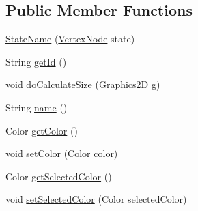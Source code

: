 \subsection*{Public Member Functions}
\begin{DoxyCompactItemize}
\item 
\hyperlink{classorg_1_1tzi_1_1use_1_1gui_1_1views_1_1diagrams_1_1statemachine_1_1_state_name_a354e23ea530608c8c6857a61eee9492a}{State\-Name} (\hyperlink{classorg_1_1tzi_1_1use_1_1gui_1_1views_1_1diagrams_1_1statemachine_1_1_vertex_node}{Vertex\-Node} state)
\item 
String \hyperlink{classorg_1_1tzi_1_1use_1_1gui_1_1views_1_1diagrams_1_1statemachine_1_1_state_name_ac1d30ebce2ad16f1b1d82355ebb743f3}{get\-Id} ()
\item 
void \hyperlink{classorg_1_1tzi_1_1use_1_1gui_1_1views_1_1diagrams_1_1statemachine_1_1_state_name_a2314dea1f28ae5cb8d570666411fa388}{do\-Calculate\-Size} (Graphics2\-D g)
\item 
String \hyperlink{classorg_1_1tzi_1_1use_1_1gui_1_1views_1_1diagrams_1_1statemachine_1_1_state_name_a73525b08944bd66e9c221cf79d8ffd98}{name} ()
\item 
Color \hyperlink{classorg_1_1tzi_1_1use_1_1gui_1_1views_1_1diagrams_1_1statemachine_1_1_state_name_a9572c6df9322ac1963795d8e7b73ac01}{get\-Color} ()
\item 
void \hyperlink{classorg_1_1tzi_1_1use_1_1gui_1_1views_1_1diagrams_1_1statemachine_1_1_state_name_a1d43a1ad450d52bf6b9fbd07f246c06f}{set\-Color} (Color color)
\item 
Color \hyperlink{classorg_1_1tzi_1_1use_1_1gui_1_1views_1_1diagrams_1_1statemachine_1_1_state_name_addcf44ef2ff6647f7561b5deb9e71681}{get\-Selected\-Color} ()
\item 
void \hyperlink{classorg_1_1tzi_1_1use_1_1gui_1_1views_1_1diagrams_1_1statemachine_1_1_state_name_a4e665511921cb80fa80cf9b3c58df1bc}{set\-Selected\-Color} (Color selected\-Color)
\end{DoxyCompactItemize}
